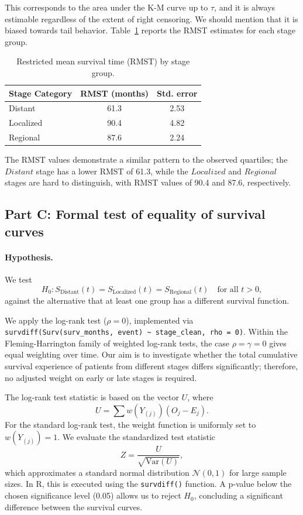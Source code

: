 \documentclass[12pt]{article}
\begin{document}
This corresponds to the area under the K-M curve up to $\tau$, and it is always estimable regardless of the extent of right censoring. We should mention that it is biased towards tail behavior. Table~\ref{tab:rmst} reports the RMST estimates for each stage group.

\begin{table}[htbp]
\centering
\small
\begin{tabular}{lcc}
\toprule
Stage Category & RMST (months) & Std. error \\
\midrule
Distant   & 61.3 & 2.53 \\
Localized & 90.4 & 4.82 \\
Regional  & 87.6 & 2.24 \\
\bottomrule
\end{tabular}
\caption{Restricted mean survival time (RMST) by stage group.}
\label{tab:rmst}
\end{table}

The RMST values demonstrate a similar pattern to the observed quartiles; the $Distant$ stage has a lower RMST of 61.3, while the $Localized$ and $Regional$ stages are hard to distinguish, with RMST values of 90.4 and 87.6, respectively.

\subsection*{Part C: Formal test of equality of survival curves}

\paragraph{Hypothesis.}
We test
\[
H_0: S_{\text{Distant}}(t) = S_{\text{Localized}}(t) = S_{\text{Regional}}(t) \quad \text{for all } t>0,
\]
against the alternative that at least one group has a different survival function. 

We apply the log-rank test ($\rho = 0$), implemented via \texttt{survdiff(Surv(surv\_months, event) \textasciitilde{} stage\_clean, rho = 0)}. Within the Fleming-Harrington family of weighted log-rank tests, the case $\rho = \gamma = 0$ gives equal weighting over time. Our aim is to investigate whether the total cumulative survival experience of patients from different stages differs significantly; therefore, no adjusted weight on early or late stages is required. 

The log-rank test statistic is based on the vector $U$, where
\[
U = \sum w(Y_{(j)})(O_j - E_j).
\]
For the standard log-rank test, the weight function is uniformly set to $w(Y_{(j)}) = 1$. We evaluate the standardized test statistic
\[
Z = \frac{U}{\sqrt{\text{Var}(U)}},
\]
which approximates a standard normal distribution $\mathcal{N}(0, 1)$ for large sample sizes. In R, this is executed using the \texttt{survdiff()} function. A p-value below the chosen significance level (0.05) allows us to reject $H_0$, concluding a significant difference between the survival curves.
\end{document}
